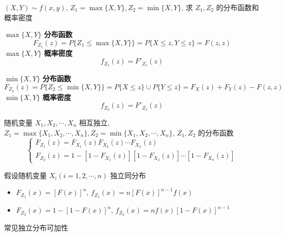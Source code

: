	
\begin{proposition}[最大值和最小值的分布]
	$(X,Y)\sim f(x,y)$, $Z_{1} = \max\{X,Y\}, Z_{2} = \min\{X,Y\}$, 求 $Z_{1}, Z_{2}$ 的分布函数和概率密度
	
	$\max\{X,Y\}$ \textbf{分布函数}
	$$F_{Z_{1}}(z) = P\{Z_{1}\leq \max\{X,Y\}\} = P\{X\leq z, Y\leq z\} = F(z,z)$$
	$\max\{X,Y\}$ \textbf{概率密度}
	$$f_{Z_{1}}(z) = F'_{Z_{1}}(z)$$

	$\min\{X,Y\}$ \textbf{分布函数}
	$$F_{Z_{2}}(z) = P\{Z_{2}\leq \min\{X,Y\}\} = P\{X\leq z\} \cup P\{Y\leq z\} = F_{X}(z) + F_{Y}(z) - F(z,z)$$
	$\min\{X,Y\}$ \textbf{概率密度}
	$$f_{Z_{2}}(z) = F'_{Z_{2}}(z)$$
\end{proposition}	

\begin{corollary}[独立同分布随机变量推论]
	随机变量 $X_{1}, X_{2}, \cdots, X_{n}$ 相互独立, $Z_{1} = \max\{X_{1}, X_{2}, \cdots, X_{n}\}, Z_{2} = \min\{X_{1}, X_{2}, \cdots, X_{n}\}$, $Z_{1}, Z_{2}$ 的分布函数
	$$\begin{cases}
		F_{Z_{1}}(z) = F_{X_{1}}(z)F_{X_{2}}(z)\cdots F_{X_{n}}(z)\\
		F_{Z_{2}}(z) = 1-[1-F_{X_{1}}(z)][1-F_{X_{2}}(z)]\cdots[1-F_{X_{n}}(z)]
	\end{cases}$$

	假设随机变量 $X_{i}(i = 1, 2, \cdots, n)$ 独立同分布
	\begin{itemize}
		\item $F_{Z_{1}}(x) = [F(x)]^{n}$, $f_{Z_{1}}(x) = n[F(x)]^{n-1}f(x)$
		\item $F_{Z_{2}}(x) = 1-[1-F(x)]^{n}$, $f_{Z_{2}}(x) = nf(x)[1-F(x)]^{n-1}$
	\end{itemize}
\end{corollary}

\begin{table}[ht]
	\centering
	\caption{常见独立分布可加性}
	\label{table: 常见独立分布可加性}
\end{table}
